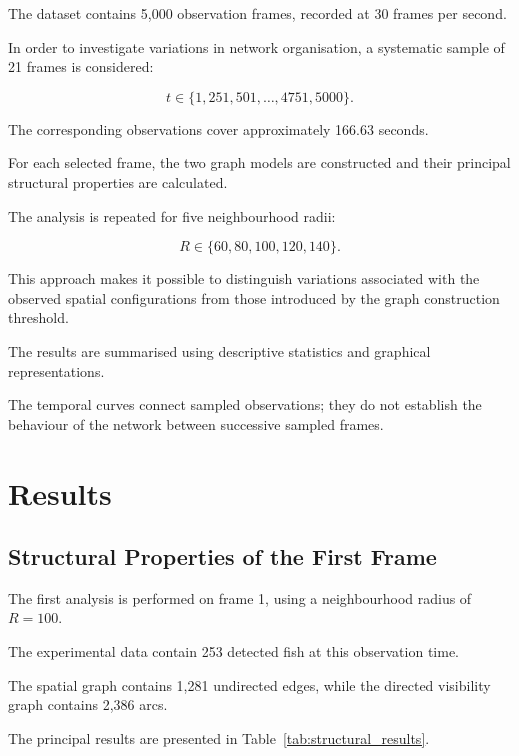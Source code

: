 \documentclass[10pt,a4paper]{article}
\begin{document}
The dataset contains 5,000 observation frames,
recorded at 30 frames per second.

In order to investigate variations in network
organisation, a systematic sample of 21 frames
is considered:

\begin{equation}
t\in
\{1,251,501,\ldots,4751,5000\}.
\end{equation}

The corresponding observations cover approximately
166.63 seconds.

For each selected frame, the two graph models
are constructed and their principal structural
properties are calculated.

The analysis is repeated for five neighbourhood
radii:

\begin{equation}
R\in\{60,80,100,120,140\}.
\end{equation}

This approach makes it possible to distinguish
variations associated with the observed spatial
configurations from those introduced by the
graph construction threshold.

The results are summarised using descriptive
statistics and graphical representations.

The temporal curves connect sampled observations;
they do not establish the behaviour of the network
between successive sampled frames.


\section{Results}

\subsection{Structural Properties of the First Frame}

The first analysis is performed on frame 1,
using a neighbourhood radius of $R=100$.

The experimental data contain 253 detected fish
at this observation time.

The spatial graph contains 1,281 undirected edges,
while the directed visibility graph contains
2,386 arcs.

The principal results are presented in
Table~\ref{tab:structural_results}.
\end{document}
